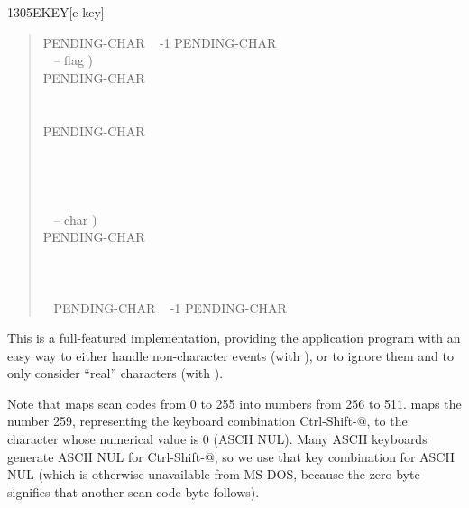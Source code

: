 \begin{worddef}{1305}{EKEY}[e-key]
\begin{defer}
\begin{quote}
\begin{tabbing}
			 PENDING-CHAR ~ -1 PENDING-CHAR \word{!} \\[\parskip]

			\+ \word{:} ~  -- flag ) \\
				\+ PENDING-CHAR    \\
					\+ ~   \\
						\+    \\
						\-	PENDING-CHAR \word{!}~   \\
					\-   \\
				\- ~   \\
			\- ~  \\
			\word{;} \\[\parskip]

			\+ \word{:} ~  -- char ) \\
				\+ PENDING-CHAR    \\
					~ ~    \\
					\>  \\
				\-	~  \\
			\- ~ PENDING-CHAR ~ -1 PENDING-CHAR \word{!} \\
			\word{;}
			\end{tabbing}
		\end{quote}

		This is a full-featured implementation, providing the
		application program with an easy way to either handle
		non-character events (with ), or to ignore them
		and to only consider ``real'' characters (with
		).

		Note that  maps scan codes from 0 to 255 into
		numbers from 256 to 511.  maps the number 259,
		representing the keyboard combination Ctrl-Shift-@, to the
		character whose numerical value is 0 (ASCII NUL). Many ASCII
		keyboards generate ASCII NUL for Ctrl-Shift-@, so we use that
		key combination for ASCII NUL (which is otherwise unavailable
		from MS-DOS, because the zero byte signifies that another
		scan-code byte follows).


\end{defer}
\end{worddef}
